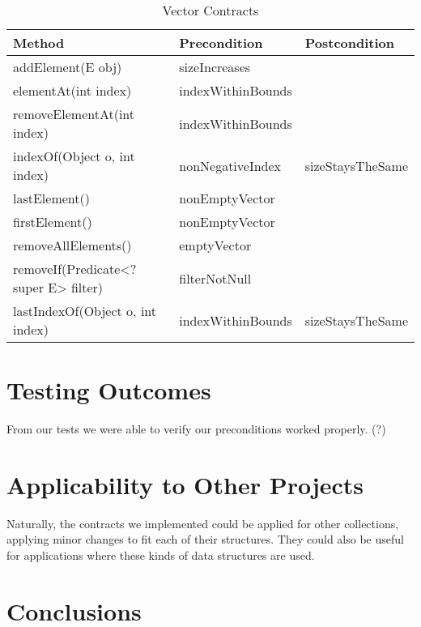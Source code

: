 \documentclass[a4paper]{article}
\begin{document}
	\begin{table}[h!]
	\begin{tabular}{|l|l|l|}
	\hline
	\textbf{Method}                      & \textbf{Precondition}        & \textbf{Postcondition} \\ \hline
	addElement(E obj)                         & sizeIncreases           &                        \\ \hline
	elementAt(int index)                      & indexWithinBounds                 &                        \\ \hline
	removeElementAt(int index)         & indexWithinBounds                 &       \\ \hline
	indexOf(Object o, int index)          &  nonNegativeIndex      & sizeStaysTheSame   \\ \hline
	lastElement()    							  & nonEmptyVector         &                                    \\ \hline
	firstElement()             				  & nonEmptyVector         &                         		      \\ \hline
	removeAllElements()                             & emptyVector                    &                        \\ \hline
	removeIf(Predicate<? super E> filter)          & filterNotNull &                                    \\ \hline
	lastIndexOf(Object o, int index)               & indexWithinBounds    &      sizeStaysTheSame   \\ \hline
\end{tabular}
\caption{Vector Contracts}
	\label{table:2}
\end{table}

\section{Testing Outcomes}
From our tests we were able to verify our preconditions worked properly. (?)

\section{Applicability to Other Projects}
Naturally, the contracts we implemented could be applied for other collections, applying minor changes to fit each of their structures. They could also be useful for applications where these kinds of data structures are used. 

\section{Conclusions}
\end{document}
